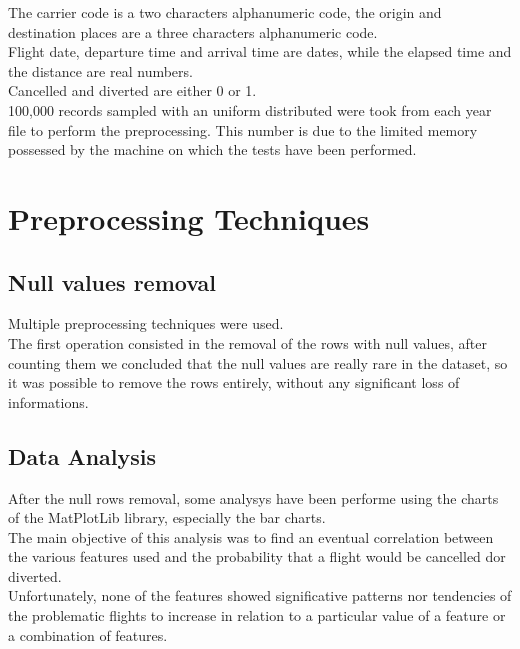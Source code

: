 \documentclass[
	letterpaper, %
	10pt, %
]{class}
\begin{document}
The carrier code is a two characters alphanumeric code, the origin and destination places are a three characters alphanumeric code.\\
Flight date, departure time and arrival time are dates, while the elapsed time and the distance are real numbers.\\
Cancelled and diverted are either 0 or 1.\\

100,000 records sampled with an uniform distributed were took from each year file to perform the preprocessing. This number is due to the limited memory
possessed by the machine on which the tests have been performed.


\section{Preprocessing Techniques}

\subsection{Null values removal}

Multiple preprocessing techniques were used.\\

The first operation consisted in the removal of the rows with null values, after counting them we concluded that the null values are really rare in the dataset, so it was possible to remove the rows entirely, without any significant loss of informations.\\

\subsection{Data Analysis}
After the null rows removal, some analysys have been performe using the charts of the MatPlotLib library, especially the bar charts.\\
The main objective of this analysis was to find an eventual correlation between the various features used and the probability that a flight would be cancelled dor diverted.\\

Unfortunately, none of the features showed significative patterns nor tendencies of the problematic flights to increase in relation to a particular value of a feature or a combination of features.\\
\end{document}
